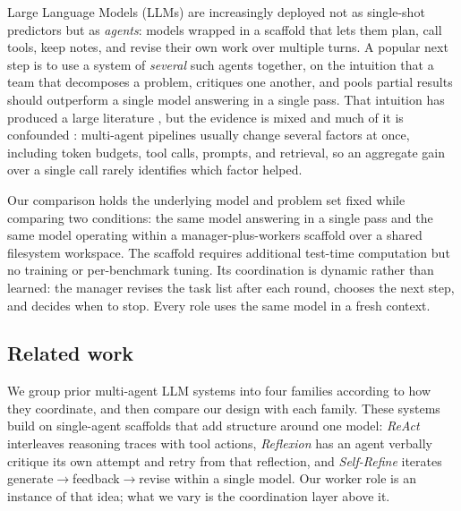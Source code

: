 \documentclass[11pt]{article}
\begin{document}
Large Language Models (LLMs) are increasingly deployed not as single-shot predictors but as
\textit{agents}: models wrapped in a scaffold that lets them plan, call tools, keep notes,
and revise their own work over multiple turns. A popular next step is to use a system of
\textit{several} such agents together, on the intuition that a team that decomposes a
problem, critiques one another, and pools partial results should outperform a single model
answering in a single pass. That intuition has produced a large literature
\cite{guo2024}, but the evidence is mixed \cite{wangq2024} and much of it is
confounded \cite{tran2026}: multi-agent pipelines usually change
several factors at once, including token budgets, tool calls, prompts, and retrieval, so
an aggregate gain over a single call rarely identifies which factor helped.

Our comparison holds the underlying model and problem set fixed while 
comparing two conditions: the same model answering in a single pass and the same model 
operating within a manager-plus-workers scaffold over a shared filesystem workspace. 
The scaffold requires additional test-time computation but no training or per-benchmark
tuning. Its coordination is dynamic rather than learned: the manager revises the task list
after each round, chooses the next step, and decides when to stop. Every role uses the same model in
a fresh context.

\subsection{Related work}

We group prior multi-agent LLM systems into four families according to how they
coordinate, and then compare our design with each family. These systems build on single-agent
scaffolds that add structure around one model: \textit{ReAct} \cite{yao2022}
interleaves reasoning traces with tool actions, \textit{Reflexion}
\cite{shinn2023} has an agent verbally critique its own attempt and
retry from that reflection, and \textit{Self-Refine} \cite{madaan2023} iterates
generate$\to$feedback$\to$revise within a single model. Our
worker role is an instance of that idea; what we vary is the coordination layer above it.
\end{document}

